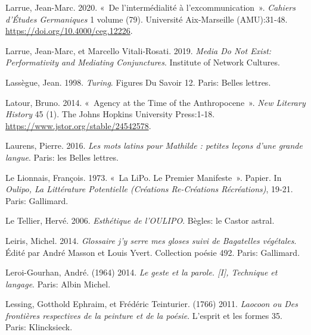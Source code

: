 \begin{CSLReferences}{1}{0}
\leavevmode{}%
Larrue, Jean-Marc. 2020. {«~{De l'interm{é}dialit{é} {à}
l'excommunication}~»}. \emph{Cahiers d'{É}tudes Germaniques} 1 volume
(79). {Universit{é} Aix-Marseille (AMU)}:31‑48.
\url{https://doi.org/10.4000/ceg.12226}.

\leavevmode{}%
Larrue, Jean-Marc, et Marcello Vitali-Rosati. 2019. \emph{Media {Do Not
Exist}: {Performativity} and {Mediating Conjunctures}}. {Institute of
Network Cultures}.

\leavevmode{}%
Lassègue, Jean. 1998. \emph{Turing}. Figures Du Savoir 12. {Paris}:
{Belles lettres}.

\leavevmode{}%
Latour, Bruno. 2014. {«~Agency at the {Time} of the {Anthropocene}~»}.
\emph{New Literary History} 45 (1). {The Johns Hopkins University
Press}:1‑18. \url{https://www.jstor.org/stable/24542578}.

\leavevmode{}%
Laurens, Pierre. 2016. \emph{{Les mots latins pour Mathilde : petites
le{ç}ons d'une grande langue}}. {Paris}: {les Belles lettres}.

\leavevmode{}%
Le Lionnais, François. 1973. {«~La {LiPo}. {Le} Premier Manifeste~»}.
Papier. In \emph{Oulipo, La Litt{é}rature Potentielle (Cr{é}ations
Re-Cr{é}ations R{é}cr{é}ations)}, 19‑21. {Paris}: {Gallimard}.

\leavevmode{}%
Le Tellier, Hervé. 2006. \emph{{Esth{é}tique de l'OULIPO}}. {B{è}gles}:
{le Castor astral}.

\leavevmode{}%
Leiris, Michel. 2014. \emph{{Glossaire j'y serre mes gloses suivi de
Bagatelles v{é}g{é}tales}}. Édité par André Masson et Louis Yvert.
{Collection po{é}sie} 492. {Paris}: {Gallimard}.

\leavevmode{}%
Leroi-Gourhan, André. (1964) 2014. \emph{{Le geste et la parole.
{[}I{]}, Technique et langage}}. {Paris}: {Albin Michel}.

\leavevmode{}%
Lessing, Gotthold Ephraim, et Frédéric Teinturier. (1766) 2011.
\emph{{Laocoon ou Des fronti{è}res respectives de la peinture et de la
po{é}sie}}. {L'esprit et les formes} 35. {Paris}: {Klincksieck}.


\end{CSLReferences}
